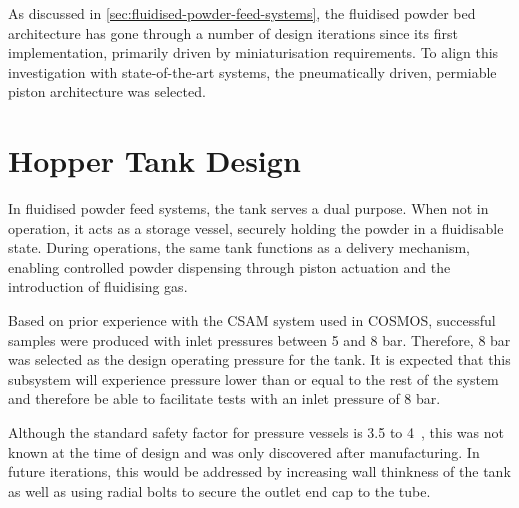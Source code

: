 As discussed in \autoref{sec:fluidised-powder-feed-systems}, the fluidised powder bed architecture has gone through a number of design iterations since its first implementation, primarily driven by miniaturisation requirements. To align this investigation with state-of-the-art systems, the pneumatically driven, permiable piston architecture was selected. 

\section{Hopper Tank Design}
In fluidised powder feed systems, the tank serves a dual purpose. When not in operation, it acts as a storage vessel, securely holding the powder in a fluidisable state. During operations, the same tank functions as a delivery mechanism, enabling controlled powder dispensing through piston actuation and the introduction of fluidising gas. 

Based on prior experience with the CSAM system used in COSMOS, successful samples were produced with inlet pressures between 5 and 8 bar. Therefore, 8 bar was selected as the design operating pressure for the tank. It is expected that this subsystem will experience pressure lower than or equal to the rest of the system and therefore be able to facilitate tests with an inlet pressure of 8 bar. 

Although the standard safety factor for pressure vessels is 3.5 to 4~\cite{redriver2024asme}, this was not known at the time of design and was only discovered after manufacturing. In future iterations, this would be addressed by increasing wall thinkness of the tank as well as using radial bolts to secure the outlet end cap to the tube.

